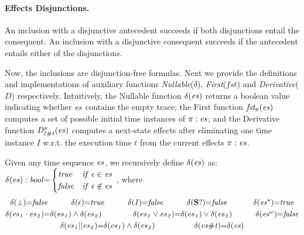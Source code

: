\documentclass[acmsmall,10pt,review]{acmart}
\newcommand{\es}{\textcolor{black}{\ensuremath{{es}}}}
\newcommand\pure[1]{ \textcolor{black}{#1}}
\newcommand{\seq}{\cdot}
\newcommand{\choice}{\vee}
\newcommand{\code}[1]{{\tt{\ensuremath{\m{#1}}}}}
\newcommand{\esn}[2]{\ensuremath{#1^{#2}}}
\newcommand{\empt}{\textcolor{black}{\ensuremath{\epsilon}}}
\newcommand{\bott}{\textcolor{black}{\ensuremath{\bot}}}
\newcommand{\m}{\mathit}
\begin{document}
{\paragraph{\textbf{Effects Disjunctions.}}
An inclusion with a disjunctive antecedent succeeds if both disjunctions entail the consequent.  An inclusion with a disjunctive consequent succeeds if the antecedent entails either of the disjunctions.  
{ 

}

Now, the inclusions are disjunction-free formulas. 
Next we provide the definitions and implementations of auxiliary functions \emph{Nullable}(\code{\delta}), \emph{First}(\code{fst}) and \emph{Derivative}(\code{D}) respectively.
Intuitively, the Nullable function \code{\delta(\es)} returns a boolean value indicating whether \code{\es} contains the empty trace; the First function \code{fst_{\pure{\pi}}( \es)} computes a set of possible initial time instances of \code{\pure{\pi} : \es}; and the Derivative function \code{D_{I\# t}^{\pure{\pi}}(\es)} computes a next-state effects after eliminating one time instance \code{I} w.r.t. the execution time \code{t} from the current effects \code{\pure{\pi} : \es}. 



%




\begin{definition}[Nullable]\label{Nullable}
Given any time sequence \code{\es}, we recursively define \code{\delta(\es)} as:\\
{
\code{\delta(\es) :bool {=}
\begin{cases}
      \code{true} & \code{if\ \empt \in \es}\\
      \code{false} & \code{if\ \empt \notin \es}
    \end{cases} }
    }, where   
{ 
\begin{gather*}
\code{\delta(\bott) {=} false} 
\qquad\quad
\code{\delta(\empt) {=} true} 
\qquad\quad
\code{\delta(I){=} false}   
\qquad\quad
\code{\delta(\textbf{S}?){=} false}   
\qquad\quad\
    \code{\delta(\esn{\es}{\star} ) {=} true}   
\\ 
\code{\delta(\es_1 \seq \es_2) {=} \delta(\es_1) \wedge \delta(\es_2)}
\qquad\qquad
  \code{\delta(\es_1 \choice \es_2) {=} \delta(\es_1) \vee \delta(\es_2)}   
  \qquad\quad
  \code{\delta(\esn{\es}{\omega} ) {=} false}     
  \\
\code{\delta(\es_1 || \es_2) {=} \delta(\es_1) \wedge \delta(\es_2)}
\qquad\qquad\quad
 \code{\delta(\es \# t) {=} \delta(\es)}
\end{gather*}}
\end{definition}

}
\end{document}
